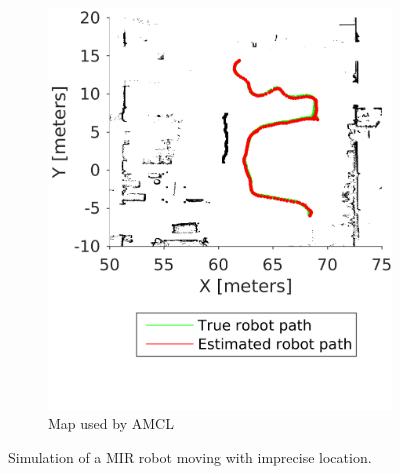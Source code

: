 \begin{figure}
\begin{subfigure}[b]{0.45\textwidth}
		\includegraphics[width=\textwidth]{figures/static_mapping/simulated_robot_estimate_total_edited}
		\caption{Map used by AMCL}
		\label{fig:simulated_robot_estimate_total_edited}
	\end{subfigure}
	\caption{Simulation of a MIR robot moving with imprecise location.}
	\label{fig:animals}
\end{figure}